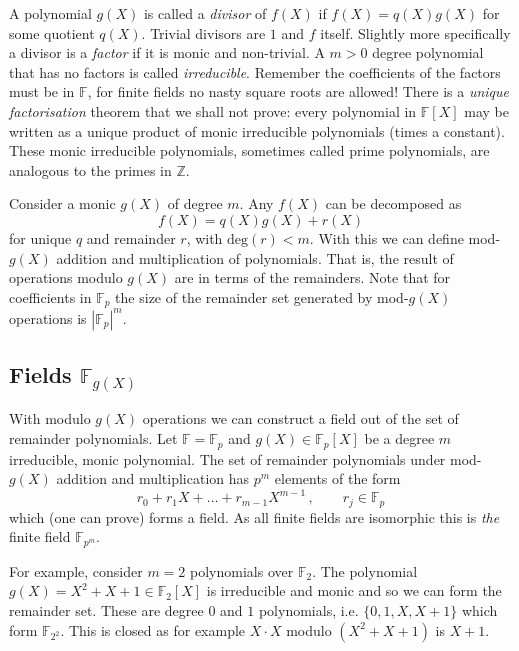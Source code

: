 \documentclass[twocolumn]{revtex4-2}
\begin{document}
A polynomial $g(X)$ is called a \emph{divisor} of $f(X)$ if $f(X) = q(X) g(X)$ for some quotient $q(X)$. Trivial divisors are $1$ and $f$ itself. 
Slightly more specifically a divisor is a \emph{factor} if it is monic and non-trivial. A $m>0$ degree polynomial that has no factors is called \emph{irreducible}. 
Remember the coefficients of the factors must be in $\mathbb{F}$, for finite fields no nasty square roots are allowed!
There is a \emph{unique factorisation} theorem that we shall not prove: every polynomial in $\mathbb{F}[X]$ may be written as a unique product of monic irreducible polynomials (times a constant).
These monic irreducible polynomials, sometimes called prime polynomials, are analogous to the primes in $\mathbb{Z}$.

Consider a monic $g(X)$ of degree $m$. Any $f(X)$ can be decomposed as
\begin{equation}
f(X) = q(X) g(X) + r(X)
\end{equation}
for unique $q$ and remainder $r$, with $\text{deg}(r) < m$. With this we can define mod-$g(X)$ addition and multiplication of polynomials.
That is, the result of operations modulo $g(X)$ are in terms of the remainders. 
Note that for coefficients in $\mathbb{F}_p$ the size of the remainder set generated by mod-$g(X)$ operations is $|\mathbb{F}_p|^m$.

\subsection{Fields $\mathbb{F}_{g(X)}$}
With modulo $g(X)$ operations we can construct a field out of the set of remainder polynomials. Let $\mathbb{F} = \mathbb{F}_p$ and $g(X) \in \mathbb{F}_p[X]$ be a degree $m$ irreducible, monic polynomial.
The set of remainder polynomials under mod-$g(X)$ addition and multiplication has $p^m$ elements of the form
\begin{equation}
    r_0 + r_1 X + \ldots + r_{m-1} X^{m-1} \, , \qquad r_j \in \mathbb{F}_p
\end{equation}
which (one can prove) forms a field. As all finite fields are isomorphic this is \emph{the} finite field $\mathbb{F}_{p^m}$.

For example, consider $m=2$ polynomials over $\mathbb{F}_2$. The polynomial $g(X) = X^2 + X + 1 \in \mathbb{F}_2[X]$ is irreducible and monic and so we can form the remainder set.
These are degree $0$ and $1$ polynomials, i.e. $\{0,1,X, X+1\}$ which form $\mathbb{F}_{2^2}$. This is closed as for example $X \cdot X$ modulo $(X^2 + X + 1)$ is $X + 1$.
\end{document}
